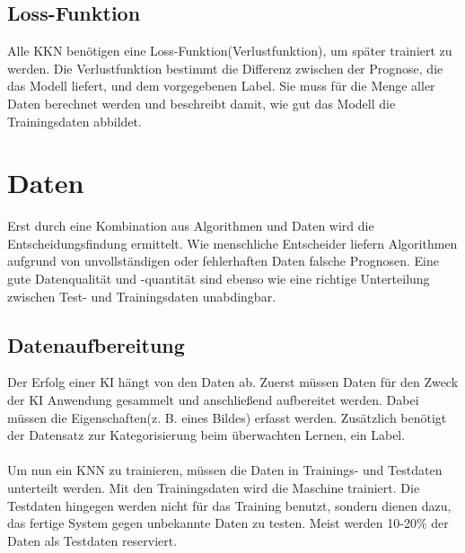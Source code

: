 \documentclass[12pt,oneside,a4paper,parskip]{scrbook}
\begin{document}
\subsection{Loss-Funktion}
\label{section:lossFunction}
Alle KKN benötigen eine Loss-Funktion(Verlustfunktion), um später trainiert zu werden. Die Verlustfunktion bestimmt die Differenz zwischen der Prognose, die das Modell liefert, und dem vorgegebenen Label. Sie muss für die Menge aller Daten berechnet werden und beschreibt damit, wie gut das Modell die Trainingsdaten abbildet.

\section{Daten}
\label{section:Data}
Erst durch eine Kombination aus Algorithmen und Daten wird die Entscheidungsfindung ermittelt. Wie menschliche Entscheider liefern Algorithmen aufgrund von unvollständigen oder fehlerhaften Daten falsche Prognosen. Eine gute Datenqualität und -quantität sind ebenso wie eine richtige Unterteilung zwischen Test- und Trainingsdaten unabdingbar.

\subsection{Datenaufbereitung}
\label{section:dataSetup}
Der Erfolg einer KI hängt von den Daten ab. Zuerst müssen Daten für den Zweck der KI Anwendung gesammelt und anschließend aufbereitet werden. Dabei müssen die Eigenschaften(z. B. eines Bildes) erfasst werden. Zusätzlich benötigt der Datensatz zur Kategorisierung beim überwachten Lernen, ein Label.
\\\\
Um nun ein KNN zu trainieren, müssen die Daten in Trainings- und Testdaten unterteilt werden. Mit den Trainingsdaten wird die Maschine trainiert. Die Testdaten hingegen werden nicht für das Training benutzt, sondern dienen dazu, das fertige System gegen unbekannte Daten zu testen. Meist werden 10-20\% der Daten als Testdaten reserviert.
\end{document}
